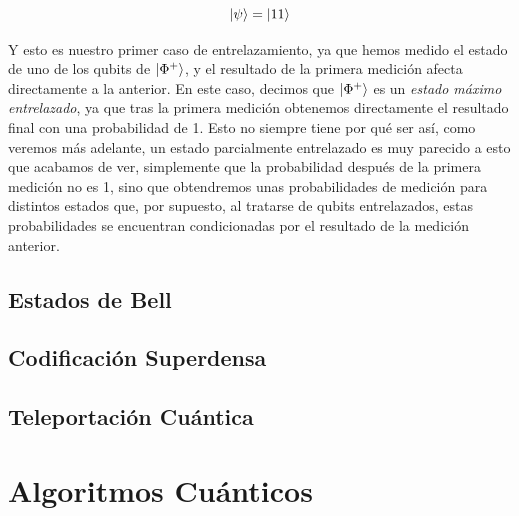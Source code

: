 \documentclass{article}
\numberwithin{equation}{section} %
\begin{document}
    \begin{equation*}
        \ket{\psi} = \ket{1 1}
    \end{equation*}

    \vspace{2.5mm}

    Y esto es nuestro primer caso de entrelazamiento, ya que hemos medido el estado de uno de los qubits de \( \ket{\Phi^{+}} \), y el resultado de la primera medición afecta directamente a la anterior. En este caso, decimos que \( \ket{\Phi^{+}} \) es un \textit{estado máximo entrelazado}, ya que tras la primera medición obtenemos directamente el resultado final con una probabilidad de 1. Esto no siempre tiene por qué ser así, como veremos más adelante, un estado parcialmente entrelazado es muy parecido a esto que acabamos de ver, simplemente que la probabilidad después de la primera medición no es 1, sino que obtendremos unas probabilidades de medición para distintos estados que, por supuesto, al tratarse de qubits entrelazados, estas probabilidades se encuentran condicionadas por el resultado de la medición anterior.

    \vspace{5mm}




    
    \subsection{Estados de Bell}

    \vspace{5mm}

    

    \vspace{5mm}

    \subsection{Codificación Superdensa}
    \subsection{Teleportación Cuántica}





    \newpage
    \thispagestyle{empty}
    \mbox{}

    \section{Algoritmos Cuánticos}\label{sec: algoritmos_cuanticos}
\end{document}
